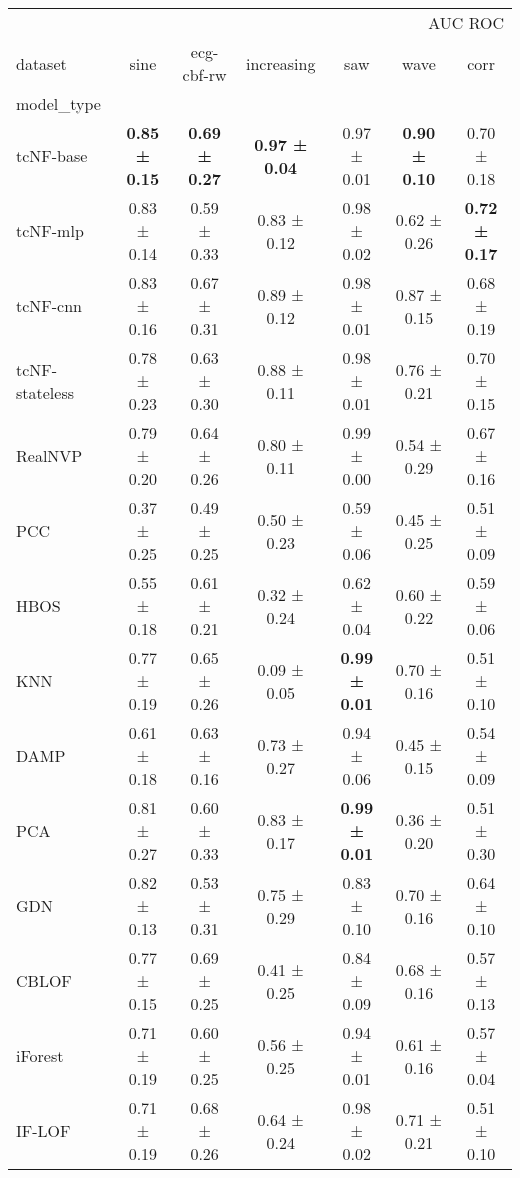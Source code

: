 \begin{tabular}{lcccccc}
\toprule
 & \multicolumn{6}{r}{AUC ROC} \\
dataset & sine & ecg-cbf-rw & increasing & saw & wave & corr \\
model_type &  &  &  &  &  &  \\
\midrule
tcNF-base & \bfseries 0.85 ± 0.15 & \bfseries 0.69 ± 0.27 & \bfseries 0.97 ± 0.04 & 0.97 ± 0.01 & \bfseries 0.90 ± 0.10 & 0.70 ± 0.18 \\
tcNF-mlp & 0.83 ± 0.14 & 0.59 ± 0.33 & 0.83 ± 0.12 & 0.98 ± 0.02 & 0.62 ± 0.26 & \bfseries 0.72 ± 0.17 \\
tcNF-cnn & 0.83 ± 0.16 & 0.67 ± 0.31 & 0.89 ± 0.12 & 0.98 ± 0.01 & 0.87 ± 0.15 & 0.68 ± 0.19 \\
tcNF-stateless & 0.78 ± 0.23 & 0.63 ± 0.30 & 0.88 ± 0.11 & 0.98 ± 0.01 & 0.76 ± 0.21 & 0.70 ± 0.15 \\
RealNVP & 0.79 ± 0.20 & 0.64 ± 0.26 & 0.80 ± 0.11 & 0.99 ± 0.00 & 0.54 ± 0.29 & 0.67 ± 0.16 \\
PCC & 0.37 ± 0.25 & 0.49 ± 0.25 & 0.50 ± 0.23 & 0.59 ± 0.06 & 0.45 ± 0.25 & 0.51 ± 0.09 \\
HBOS & 0.55 ± 0.18 & 0.61 ± 0.21 & 0.32 ± 0.24 & 0.62 ± 0.04 & 0.60 ± 0.22 & 0.59 ± 0.06 \\
KNN & 0.77 ± 0.19 & 0.65 ± 0.26 & 0.09 ± 0.05 & \bfseries 0.99 ± 0.01 & 0.70 ± 0.16 & 0.51 ± 0.10 \\
DAMP & 0.61 ± 0.18 & 0.63 ± 0.16 & 0.73 ± 0.27 & 0.94 ± 0.06 & 0.45 ± 0.15 & 0.54 ± 0.09 \\
PCA & 0.81 ± 0.27 & 0.60 ± 0.33 & 0.83 ± 0.17 & \bfseries 0.99 ± 0.01 & 0.36 ± 0.20 & 0.51 ± 0.30 \\
GDN & 0.82 ± 0.13 & 0.53 ± 0.31 & 0.75 ± 0.29 & 0.83 ± 0.10 & 0.70 ± 0.16 & 0.64 ± 0.10 \\
CBLOF & 0.77 ± 0.15 & 0.69 ± 0.25 & 0.41 ± 0.25 & 0.84 ± 0.09 & 0.68 ± 0.16 & 0.57 ± 0.13 \\
iForest & 0.71 ± 0.19 & 0.60 ± 0.25 & 0.56 ± 0.25 & 0.94 ± 0.01 & 0.61 ± 0.16 & 0.57 ± 0.04 \\
IF-LOF & 0.71 ± 0.19 & 0.68 ± 0.26 & 0.64 ± 0.24 & 0.98 ± 0.02 & 0.71 ± 0.21 & 0.51 ± 0.10 \\
\bottomrule
\end{tabular}
